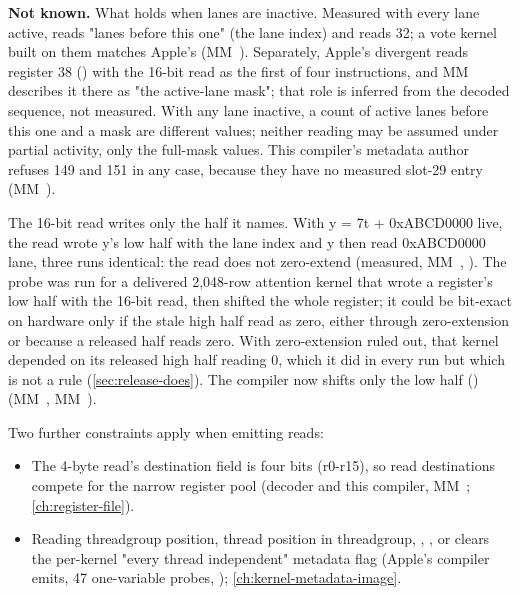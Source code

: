 \textbf{Not known.} What  holds when lanes are inactive. Measured with every lane active,  reads "lanes before
this one" (the lane index) and  reads 32; a vote kernel built on them matches Apple's 
(MM~). Separately, Apple's divergent  reads register 38 () with the 16-bit read as
the first of four instructions, and MM~ describes it there as "the active-lane mask"; that role is inferred from the decoded
sequence, not measured. With any lane inactive, a count of active lanes before this one and a mask are different values;
neither reading may be assumed under partial activity, only the full-mask values. This compiler's metadata
author refuses 149 and 151 in any case, because they have no measured slot-29 entry (MM~).

The 16-bit read writes only the half it names. With y = 7t +
0xABCD0000 live, the read wrote y's low half with the lane index and y then read 0xABCD0000 \textbar{} lane, three runs identical: the
read does not zero-extend (measured, MM~, ). The probe was
run for a delivered 2,048-row attention kernel that wrote a register's low half with the 16-bit read, then shifted the
whole register; it could be bit-exact on hardware only if the stale high half read as zero, either through zero-extension
or because a released half reads zero. With zero-extension ruled out, that kernel depended on its released
high half reading 0, which it did in every run but which is not a rule (\cref{sec:release-does}). The
compiler now shifts only the low half () (MM~, MM~).

Two further constraints apply when emitting reads:

\begin{itemize}
\item The 4-byte read's destination field is four bits (r0-r15), so read destinations compete for the narrow register pool
  (decoder and this compiler, MM~; \cref{ch:register-file}).
\item Reading threadgroup position, thread position in threadgroup, , ,  or  clears the
  per-kernel "every thread independent" metadata flag (Apple's compiler emits, 47 one-variable probes, );
  \cref{ch:kernel-metadata-image}.
\end{itemize}

